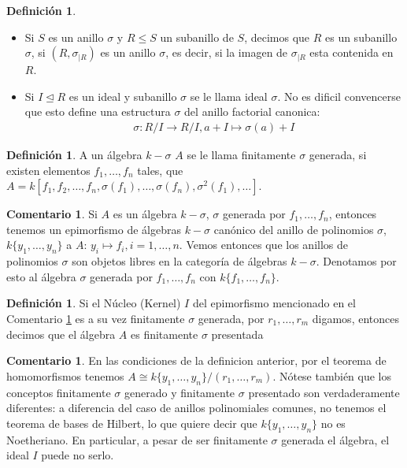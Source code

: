 \documentclass[12pt,a4paper,BCOR15mm,twoside,DIV12]{article}
\theoremstyle{definition}
\newtheorem{rem}[Satz]{Comentario}
\newtheorem{defn}[Satz]{Definición}
\begin{document}
\begin{defn}
\begin{itemize}
\item Si $S$ es un anillo $\sigma$ y $R \leq S$ un subanillo de $S$, decimos que $R$ es un subanillo $\sigma$, si $(R,\sigma_{|R})$ es un anillo $\sigma$,
es decir, si la imagen de $\sigma_{|R}$ esta contenida en $R$.
\item Si $I \unlhd R$ es un ideal y subanillo $\sigma$ se le llama ideal $\sigma$. No es dificil convencerse que esto define una estructura $\sigma$ del anillo factorial canonica:
\begin{align*} \sigma: R/I \rightarrow R/I, a + I \mapsto \sigma(a) + I \end{align*}
\end{itemize}
\end{defn}

\begin{defn}
A un álgebra $k-\sigma$ $A$ se le llama finitamente $\sigma$ generada, si existen elementos $f_1, \ldots, f_n$ tales, que $A = k[f_1,f_2,\ldots,f_n,\sigma(f_1),\ldots,\sigma(f_n),\sigma^2(f_1),\ldots]$.
\end{defn}

\begin{rem}\label{epipoli}
Si $A$ es un álgebra $k-\sigma$, $\sigma$ generada por $f_1, \ldots, f_n$, entonces tenemos un epimorfismo de 
álgebras $k-\sigma$ canónico del anillo de polinomios $\sigma$, $k\{y_1, \ldots, y_n \}$ a $A$: $y_i \mapsto f_i, i = 1, \ldots, n$.
Vemos entonces que los anillos de polinomios $\sigma$ son objetos libres en la categoría de álgebras $k-\sigma$. Denotamos por esto al
álgebra $\sigma$ generada por $f_1, \ldots, f_n$ con $k\{f_1, \ldots, f_n\}$.
\end{rem}

\begin{defn}
Si el Núcleo (Kernel) $I$ del epimorfismo mencionado en el Comentario \ref{epipoli} es a su vez finitamente $\sigma$ generada, por $r_1, \ldots, r_m$ digamos, entonces decimos que el álgebra $A$ es finitamente $\sigma$ presentada
\end{defn}

\begin{rem}
En las condiciones de la definicion anterior, por el teorema de homomorfismos tenemos $A \cong k\{y_1, \ldots, y_n\}/(r_1,\ldots,r_m)$. Nótese también que los conceptos finitamente $\sigma$ generado y finitamente $\sigma$ presentado son
verdaderamente diferentes: a diferencia del caso de anillos polinomiales comunes, no tenemos el teorema de bases de Hilbert, lo que quiere decir que $k\{y_1, \ldots, y_n\}$ no es Noetheriano. En particular, a pesar de ser 
finitamente $\sigma$ generada el álgebra, el ideal $I$ puede no serlo.
\end{rem}
\end{document}
